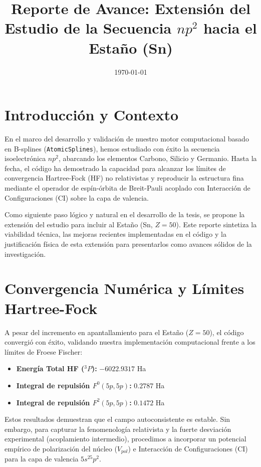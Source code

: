 \documentclass[12pt,a4paper]{article}
\title{\textbf{Reporte de Avance: Extensión del Estudio de la Secuencia $np^2$ hacia el Estaño (Sn)}}
\author{}
\date{\today}
\begin{document}
\maketitle

\section{Introducción y Contexto}
En el marco del desarrollo y validación de nuestro motor computacional basado en B-splines (\texttt{AtomicSplines}), hemos estudiado con éxito la secuencia isoelectrónica $np^2$, abarcando los elementos Carbono, Silicio y Germanio. Hasta la fecha, el código ha demostrado la capacidad para alcanzar los límites de convergencia Hartree-Fock (HF) no relativistas y reproducir la estructura fina mediante el operador de espín-órbita de Breit-Pauli acoplado con Interacción de Configuraciones (CI) sobre la capa de valencia.

Como siguiente paso lógico y natural en el desarrollo de la tesis, se propone la extensión del estudio para incluir al Estaño (Sn, $Z=50$). Este reporte sintetiza la viabilidad técnica, las mejoras recientes implementadas en el código y la justificación física de esta extensión para presentarlos como avances sólidos de la investigación.

\section{Convergencia Numérica y Límites Hartree-Fock}
A pesar del incremento en apantallamiento para el Estaño ($Z=50$), el código convergió con éxito, validando nuestra implementación computacional frente a los límites de Froese Fischer:

\begin{itemize}
    \item \textbf{Energía Total HF ($^3P$):} $-6022.9317$ Ha
    \item \textbf{Integral de repulsión $F^0(5p, 5p)$:} $0.2787$ Ha
    \item \textbf{Integral de repulsión $F^2(5p, 5p)$:} $0.1472$ Ha
\end{itemize}

Estos resultados demuestran que el campo autoconsistente es estable. Sin embargo, para capturar la fenomenología relativista y la fuerte desviación experimental (acoplamiento intermedio), procedimos a incorporar un potencial empírico de polarización del núcleo ($V_{pol}$) e Interacción de Configuraciones (CI) para la capa de valencia $5s^25p^2$.
\end{document}
